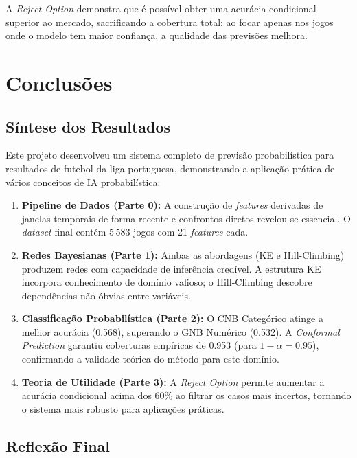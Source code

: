 \documentclass[12pt, a4paper]{article}
\begin{document}
A \textit{Reject Option} demonstra que é possível obter uma acurácia condicional superior ao mercado, sacrificando a cobertura total: ao focar apenas nos jogos onde o modelo tem maior confiança, a qualidade das previsões melhora.

\section{Conclusões}

\subsection{Síntese dos Resultados}

Este projeto desenvolveu um sistema completo de previsão probabilística para resultados de futebol da liga portuguesa, demonstrando a aplicação prática de vários conceitos de IA probabilística:

\begin{enumerate}
  \item \textbf{Pipeline de Dados (Parte 0):} A construção de \textit{features} derivadas de janelas temporais de forma recente e confrontos diretos revelou-se essencial. O \textit{dataset} final contém 5\,583 jogos com 21 \textit{features} cada.

  \item \textbf{Redes Bayesianas (Parte 1):} Ambas as abordagens (KE e Hill-Climbing) produzem redes com capacidade de inferência credível. A estrutura KE incorpora conhecimento de domínio valioso; o Hill-Climbing descobre dependências não óbvias entre variáveis.

  \item \textbf{Classificação Probabilística (Parte 2):} O CNB Categórico atinge a melhor acurácia (0.568), superando o GNB Numérico (0.532). A \textit{Conformal Prediction} garantiu coberturas empíricas de 0.953 (para $1-\alpha=0.95$), confirmando a validade teórica do método para este domínio.

  \item \textbf{Teoria de Utilidade (Parte 3):} A \textit{Reject Option} permite aumentar a acurácia condicional acima dos 60\% ao filtrar os casos mais incertos, tornando o sistema mais robusto para aplicações práticas.
\end{enumerate}

\subsection{Reflexão Final}
\end{document}
